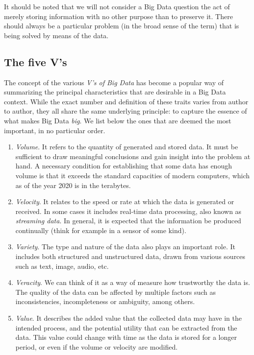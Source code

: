 It should be noted that we will not consider a Big Data question the act of merely storing information with no other purpose than to preserve it. There should always be a particular problem (in the broad sense of the term) that is being solved by means of the data.

\subsection{The five V's}

The concept of the various \textit{V's of Big Data} has become a popular way of summarizing the principal characteristics that are desirable in a Big Data context. While the exact number and definition of these traits varies from author to author, they all share the same underlying principle: to capture the essence of what makes Big Data \textit{big}. We list below the ones that are deemed the most important, in no particular order.

\begin{enumerate}[1.]
  \item \textit{Volume}. It refers to the quantity of generated and stored data. It must be sufficient to draw meaningful conclusions and gain insight into the problem at hand. A necessary condition for establishing that some data has enough volume is that it exceeds the standard capacities of modern computers, which as of the year 2020 is in the terabytes.
  \item \textit{Velocity}. It relates to the speed or rate at which the data is generated or received. In some cases it includes real-time data processing, also known as \textit{streaming data}. In general, it is expected that the information be produced continually (think for example in a sensor of some kind).
  \item \textit{Variety}. The type and nature of the data also plays an important role. It includes both structured and unstructured data, drawn from various sources such as text, image, audio, etc.
  \item \textit{Veracity}. We can think of it as a way of measure how trustworthy the data is. The quality of the data can be affected by multiple factors such as inconsistencies, incompleteness or ambiguity, among others.
  \item \textit{Value}. It describes the added value that the collected data may have in the intended process, and the potential utility that can be extracted from the data. This value could change with time as the data is stored for a longer period, or even if the volume or velocity are modified.
\end{enumerate}


